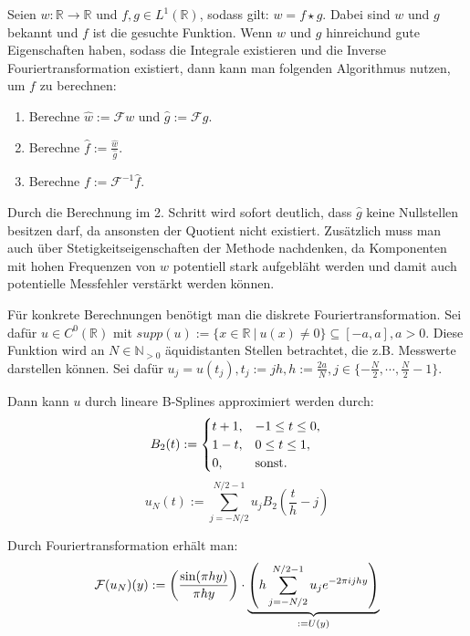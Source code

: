 \documentclass{article}
\newcommand{\R}[0]{\mathbb{R}}
\begin{document}
Seien $w: \R \to \R$ und $f, g \in L^1(\R)$, sodass gilt: $w = f \star g$. Dabei sind $w$ und $g$ bekannt und $f$ ist die gesuchte Funktion.
Wenn $w$ und $g$ hinreichund gute Eigenschaften haben, sodass die Integrale existieren und die Inverse Fouriertransformation existiert, dann kann
man folgenden Algorithmus nutzen, um $f$ zu berechnen:
\begin{enumerate}
    \item Berechne $\hat{w} := \mathcal{F}w$ und $\hat{g} := \mathcal{F}g$.
    \item Berechne $\hat{f} := \frac{\hat{w}}{\hat{g}}$.
    \item Berechne $f := \mathcal{F}^{-1}\hat{f}$.
\end{enumerate}

Durch die Berechnung im 2. Schritt wird sofort deutlich, dass $\hat{g}$ keine Nullstellen besitzen darf,
da ansonsten der Quotient nicht existiert. Zusätzlich muss man auch über Stetigkeitseigenschaften der Methode nachdenken,
da Komponenten mit hohen Frequenzen von $w$ potentiell stark aufgebläht werden 
und damit auch potentielle Messfehler verstärkt werden können.

Für konkrete Berechnungen benötigt man die diskrete Fouriertransformation. 
Sei dafür $u \in C^0(\R)$ mit $supp(u) := \{x \in \R \: | \: u(x) \neq 0 \} \subseteq [-a, a], a > 0$. Diese Funktion wird an $N \in \mathbb{N}_{>0}$ äquidistanten Stellen betrachtet, 
die z.B. Messwerte darstellen können. Sei dafür $u_j = u(t_j), t_j := jh, h:= \frac{2a}{N}, j \in \{-\frac{N}{2}, \cdots, \frac{N}{2} - 1\}$.

Dann kann $u$ durch lineare B-Splines approximiert werden durch:
\begin{equation}
    B_2(t) := \begin{cases}
        t + 1, &-1 \leq t \leq 0, \\
        1 - t, &0 \leq t \leq 1, \\
        0, &{\rm sonst}.
    \end{cases} \\
\end{equation}
\begin{equation}
    u_N(t) := \sum\limits_{j=-N/2}^{N/2-1} u_j B_2 \left(\frac{t}{h} - j\right)
\end{equation}

Durch Fouriertransformation erhält man:
\begin{equation}
    \mathcal{F}(u_N)(y) := \left(\frac{{\rm sin}(\pi h y)}{\pi h y}\right) \cdot \underbrace{\left(h \sum\limits_{j=-N/2}^{N/2-1} u_j e^{-2\pi i jhy}\right)}_{:=U(y)}
\end{equation}
\end{document}

